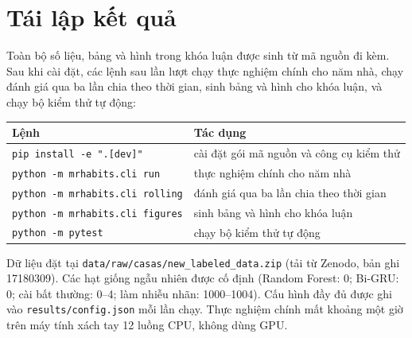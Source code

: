 \chapter{Tái lập kết quả}
\label{app:repro}

Toàn bộ số liệu, bảng và hình trong khóa luận được sinh từ mã nguồn đi kèm. Sau khi cài đặt, các lệnh sau
lần lượt chạy thực nghiệm chính cho năm nhà, chạy đánh giá qua ba lần chia theo thời gian, sinh bảng và hình
cho khóa luận, và chạy bộ kiểm thử tự động:

\begin{center}
\begin{tabular}{@{}ll@{}}
\toprule
Lệnh & Tác dụng\\
\midrule
\verb|pip install -e ".[dev]"| & cài đặt gói mã nguồn và công cụ kiểm thử\\
\verb|python -m mrhabits.cli run| & thực nghiệm chính cho năm nhà\\
\verb|python -m mrhabits.cli rolling| & đánh giá qua ba lần chia theo thời gian\\
\verb|python -m mrhabits.cli figures| & sinh bảng và hình cho khóa luận\\
\verb|python -m pytest| & chạy bộ kiểm thử tự động\\
\bottomrule
\end{tabular}
\end{center}

Dữ liệu đặt tại \texttt{data/raw/casas/new\_labeled\_data.zip} (tải từ Zenodo, bản ghi 17180309). Các hạt
giống ngẫu nhiên được cố định (Random Forest: 0; Bi-GRU: 0; cài bất thường: 0--4; làm nhiễu nhãn: 1000--1004).
Cấu hình đầy đủ được ghi vào \texttt{results/config.json} mỗi lần chạy. Thực nghiệm chính mất khoảng một giờ
trên máy tính xách tay 12 luồng CPU, không dùng GPU.
